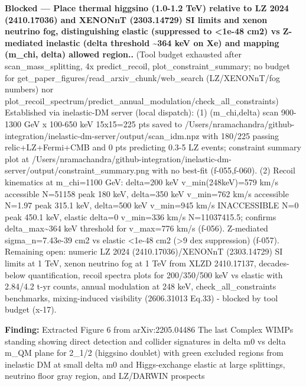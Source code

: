 \documentclass[11pt,a4paper]{article}
\begin{document}
\textbf{Blocked --- Place thermal higgsino (1.0-1.2 TeV) relative to LZ 2024 (2410.17036) and XENONnT (2303.14729) SI limits and xenon neutrino fog, distinguishing elastic (suppressed to \textless{}1e-48 cm2) vs Z-mediated inelastic (delta threshold \textasciitilde{}364 keV on Xe) and mapping (m\_chi, delta) allowed region..} (Tool budget exhausted after scan\_mass\_splitting, 4x predict\_recoil, plot\_constraint\_summary; no budget for get\_paper\_figures/read\_arxiv\_chunk/web\_search (LZ/XENONnT/fog numbers) nor plot\_recoil\_spectrum/predict\_annual\_modulation/check\_all\_constraints) Established via inelastic-DM server (local dispatch): (1) (m\_chi,delta) scan 900-1300 GeV x 100-650 keV 15x15=225 pts saved to /Users/nramachandra/github-integration/inelastic-dm-server/output/scan\_idm.npz with 180/225 passing relic+LZ+Fermi+CMB and 0 pts predicting 0.3-5 LZ events; constraint summary plot at /Users/nramachandra/github-integration/inelastic-dm-server/output/constraint\_summary.png with no best-fit (f-055,f-060). (2) Recoil kinematics at m\_chi=1100 GeV: delta=200 keV v\_min(248keV)=579 km/s accessible N=51158 peak 180 keV, delta=350 keV v\_min=762 km/s accessible N=1.97 peak 315.1 keV, delta=500 keV v\_min=945 km/s INACCESSIBLE N=0 peak 450.1 keV, elastic delta=0 v\_min=336 km/s N=11037415.5; confirms delta\_max\textasciitilde{}364 keV threshold for v\_max=776 km/s (f-056). Z-mediated sigma\_n=7.43e-39 cm2 vs elastic \textless{}1e-48 cm2 (\textgreater{}9 dex suppression) (f-057). Remaining open: numeric LZ 2024 (2410.17036)/XENONnT (2303.14729) SI limits at 1 TeV, xenon neutrino fog at 1 TeV from XLZD 2410.17137, decades-below quantification, recoil spectra plots for 200/350/500 keV vs elastic with 2.84/4.2 t-yr counts, annual modulation at 248 keV, check\_all\_constraints benchmarks, mixing-induced visibility (2606.31013 Eq.33) - blocked by tool budget (x-17).

\textbf{Finding:} Extracted Figure 6 from arXiv:2205.04486 The last Complex WIMPs standing showing direct detection and collider signatures in delta m0 vs delta m\_QM plane for 2\_1/2 (higgsino doublet) with green excluded regions from inelastic DM at small delta m0 and Higgs-exchange elastic at large splittings, neutrino floor gray region, and LZ/DARWIN prospects
\end{document}
